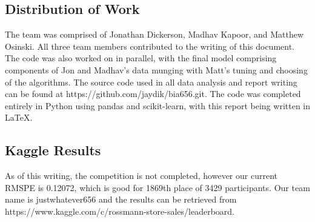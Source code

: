 \documentclass[DIV=calc, paper=a4, fontsize=11pt]{scrartcl}	 %
\begin{document}
\subsection*{Distribution of Work}
The team was comprised of Jonathan Dickerson, Madhav Kapoor, and Matthew Osinski. All three team members contributed to the writing of this document. The code was also worked on in parallel, with the final model comprising components of Jon and Madhav's data munging with Matt's tuning and choosing of the algorithms. The source code used in all data analysis and report writing can be found at https://github.com/jaydik/bia656.git. The code was completed entirely in Python using pandas and scikit-learn, with this report being written in \LaTeX. 

\subsection*{Kaggle Results}
As of this writing, the competition is not completed, however our current RMSPE is 0.12072, which is good for 1869th place of 3429 participants. Our team name is justwhatever656 and the results can be retrieved from https://www.kaggle.com/c/rossmann-store-sales/leaderboard. 
\end{document}
